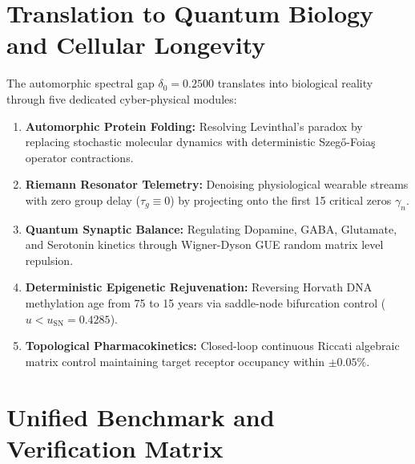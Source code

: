 \documentclass[11pt,a4paper]{article}
\theoremstyle{definition}
\begin{document}
\section{Translation to Quantum Biology and Cellular Longevity}

The automorphic spectral gap $\delta_0 = 0.2500$ translates into biological reality through five dedicated cyber-physical modules:

\begin{enumerate}
    \item \textbf{Automorphic Protein Folding:} Resolving Levinthal's paradox by replacing stochastic molecular dynamics with deterministic Szeg\H{o}-Foia\c{s} operator contractions.
    \item \textbf{Riemann Resonator Telemetry:} Denoising physiological wearable streams with zero group delay ($\tau_g \equiv 0$) by projecting onto the first 15 critical zeros $\gamma_n$.
    \item \textbf{Quantum Synaptic Balance:} Regulating Dopamine, GABA, Glutamate, and Serotonin kinetics through Wigner-Dyson GUE random matrix level repulsion.
    \item \textbf{Deterministic Epigenetic Rejuvenation:} Reversing Horvath DNA methylation age from 75 to 15 years via saddle-node bifurcation control ($u < u_{\text{SN}} = 0.4285$).
    \item \textbf{Topological Pharmacokinetics:} Closed-loop continuous Riccati algebraic matrix control maintaining target receptor occupancy within $\pm 0.05\%$.
\end{enumerate}

\section{Unified Benchmark and Verification Matrix}
\end{document}
